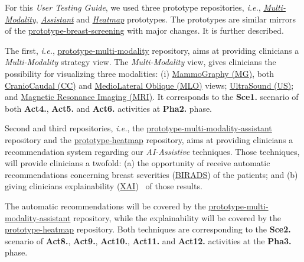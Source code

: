 For this {\it User Testing Guide}, we used three prototype repositories, \textit{i.e.}, \textit{\hyperlink{https://github.com/MIMBCD-UI/prototype-multi-modality}{Multi-Modality}}, \textit{\hyperlink{https://github.com/mida-project/prototype-multi-modality-assistant}{Assistant}} and \textit{\hyperlink{https://github.com/mida-project/prototype-heatmap}{Heatmap}} prototypes. The prototypes are similar mirrors of the \hyperlink{https://github.com/MIMBCD-UI/prototype-breast-screening}{prototype-breast-screening} with major changes. It is further described.

The first, \textit{i.e.}, \hyperlink{https://github.com/MIMBCD-UI/prototype-multi-modality}{prototype-multi-modality} repository, aims at providing clinicians a \textit{Multi-Modality} strategy view. The \textit{Multi-Modality} view, gives clinicians the possibility for visualizing three modalities: (i) \hyperlink{https://medical-dictionary.thefreedictionary.com/mammography}{MammoGraphy (MG)}, both \hyperlink{https://medical-dictionary.thefreedictionary.com/craniocaudal}{CranioCaudal (CC)} and \hyperlink{https://www.thefreedictionary.com/mediolateral}{MedioLateral Oblique (MLO)} views; \hyperlink{https://www.thefreedictionary.com/UltraSound}{UltraSound (US)}; and \hyperlink{https://www.thefreedictionary.com/Magnetic+Resonance+Imaging}{Magnetic Resonance Imaging (MRI)}. It corresponds to the \textbf{Sce1.} scenario of both \textbf{Act4.}, \textbf{Act5.} and \textbf{Act6.} activities at \textbf{Pha2.} phase.

Second and third repositories, \textit{i.e.}, the \hyperlink{https://github.com/mida-project/prototype-multi-modality-assistant}{prototype-multi-modality-assistant} repository and the \hyperlink{https://github.com/mida-project/prototype-heatmap}{prototype-heatmap} repository, aims at providing clinicians a recommendation system regarding our \textit{AI-Assistive} techniques. Those techniques, will provide clinicians a twofold: (a) the opportunity of receive automatic recommendations concerning breast severities (\hyperlink{https://en.wikipedia.org/wiki/BI-RADS}{BIRADS}) of the patients; and (b) giving clinicians explainability (\hyperlink{https://www.darpa.mil/program/explainable-artificial-intelligence}{XAI})~\cite{gunning2017explainable, holzinger2017we} of those results.

The automatic recommendations will be covered by the \hyperlink{https://github.com/mida-project/prototype-multi-modality-assistant}{prototype-multi-modality-assistant} repository, while the explainability will be covered by the \hyperlink{https://github.com/mida-project/prototype-heatmap}{prototype-heatmap} repository. Both techniques are corresponding to the \textbf{Sce2.} scenario of \textbf{Act8.}, \textbf{Act9.}, \textbf{Act10.}, \textbf{Act11.} and \textbf{Act12.} activities at the \textbf{Pha3.} phase.